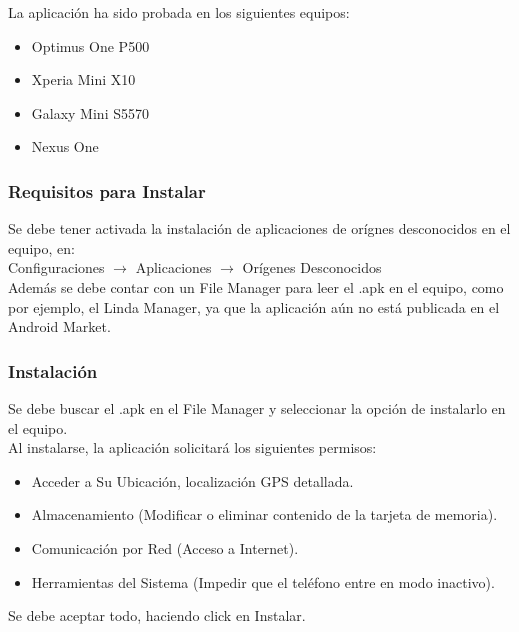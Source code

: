 \documentclass[10pt,letterpaper]{article}
\begin{document}
La aplicación ha sido probada en los siguientes equipos:\\

\begin{itemize}
 \item Optimus One P500
 \item Xperia Mini X10
 \item Galaxy Mini S5570
 \item Nexus One
\end{itemize}

\subsubsection{Requisitos para Instalar}

Se debe tener activada la instalación de aplicaciones de orígnes desconocidos en el equipo, en:\\

Configuraciones $\rightarrow$ Aplicaciones $\rightarrow$ Orígenes Desconocidos\\

Además se debe contar con un File Manager para leer el .apk en el equipo, como por ejemplo, el Linda Manager, ya que la aplicación aún no está publicada en el Android Market.\\

\subsubsection{Instalación}

Se debe buscar el .apk en el File Manager y seleccionar la opción de instalarlo en el equipo.\\

Al instalarse, la aplicación solicitará los siguientes permisos:\\

\begin{itemize}
 \item Acceder a Su Ubicación, localización GPS detallada.
 \item Almacenamiento (Modificar o eliminar contenido de la tarjeta de memoria).
 \item Comunicación por Red (Acceso a Internet).
 \item Herramientas del Sistema (Impedir que el teléfono entre en modo inactivo).
\end{itemize}

Se debe aceptar todo, haciendo click en Instalar.
\end{document}
